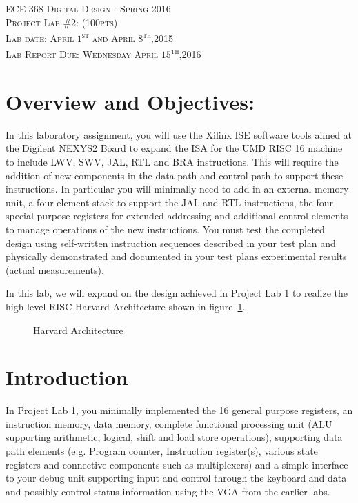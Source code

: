 \documentclass{article}
\begin{document}
\begin{center}
\textsc{\huge ECE 368 Digital Design - Spring 2016}\\[1cm]
\textsc{{\LARGE Project Lab \#2: (100pts)}}\\[0.5cm]
\textsc{\Large Lab date: April $1$\textsuperscript{st} and April $8$\textsuperscript{th},2015}\\[0.5cm]
\textsc{\Large Lab Report Due: Wednesday April $15$\textsuperscript{th},2016}\\[1cm]
\end{center}

\section{Overview and Objectives:}
In this laboratory assignment, you will use the Xilinx ISE software tools aimed at the Digilent NEXYS2 Board to expand the ISA for the UMD RISC 16 machine to include LWV, SWV, JAL, RTL and BRA instructions. This will require the addition of new components in the data path and control path to support these instructions. In particular you will minimally need to add in an external memory unit, a four element stack to support the JAL and RTL instructions, the four special purpose registers for extended addressing and additional control elements to manage operations of the new instructions. You must test the completed design using self-written instruction sequences described in your test plan and physically demonstrated and documented in your test plans experimental results (actual measurements).

In this lab, we will expand on the design achieved in Project Lab 1 to realize the high level RISC Harvard Architecture shown in figure~\ref{fig:harvardarc}.

\begin{figure}[!htbp]
  \centering
  \caption{Harvard Architecture}
  \label{fig:harvardarc}
\end{figure}
\FloatBarrier

\section{Introduction}

In Project Lab 1, you minimally implemented the 16 general purpose registers, an instruction memory, data memory, complete functional processing unit (ALU supporting arithmetic, logical, shift and load store operations), supporting data path elements (e.g. Program counter, Instruction  register(s), various state registers and connective components such as multiplexers) and a simple interface to your debug unit supporting input and control through the keyboard and data and possibly control status information using the VGA from the earlier labs. 
\end{document}
